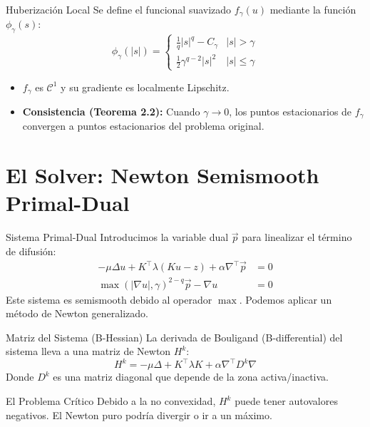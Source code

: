 \documentclass[10pt, aspectratio=169, xcolor={dvipsnames}]{beamer}
\begin{document}
\begin{frame}{Huberización Local}
    Se define el funcional suavizado $f_\gamma(u)$ mediante la función $\phi_\gamma(s)$:
    \[ \phi_\gamma(|s|) = \begin{cases} \frac{1}{q}|s|^q - C_\gamma & |s| > \gamma \\ \frac{1}{2}\gamma^{q-2}|s|^2 & |s| \le \gamma \end{cases} \]
    \begin{itemize}
        \item $f_\gamma$ es $\mathcal{C}^1$ y su gradiente es localmente Lipschitz.
        \item \textbf{Consistencia (Teorema 2.2):} Cuando $\gamma \to 0$, los puntos estacionarios de $f_\gamma$ convergen a puntos estacionarios del problema original.
    \end{itemize}
\end{frame}

\section{El Solver: Newton Semismooth Primal-Dual}

\begin{frame}{Sistema Primal-Dual}
    Introducimos la variable dual $\vec{p}$ para linealizar el término de difusión:
    \begin{align}
        -\mu\Delta u + K^\top \lambda(Ku - z) + \alpha \nabla^\top \vec{p} &= 0 \\
        \max(|\nabla u|, \gamma)^{2-q} \vec{p} - \nabla u &= 0
    \end{align}
    Este sistema es semismooth debido al operador $\max$. Podemos aplicar un método de Newton generalizado.
\end{frame}

\begin{frame}{Matriz del Sistema (B-Hessian)}
    La derivada de Bouligand (B-differential) del sistema lleva a una matriz de Newton $H^k$:
    \[ H^k = -\mu\Delta + K^\top \lambda K + \alpha \nabla^\top D^k \nabla \]
    Donde $D^k$ es una matriz diagonal que depende de la zona activa/inactiva.
    \begin{alertblock}{El Problema Crítico}
        Debido a la no convexidad, $H^k$ puede tener autovalores negativos. El Newton puro podría divergir o ir a un máximo.
    \end{alertblock}
\end{frame}
\end{document}
